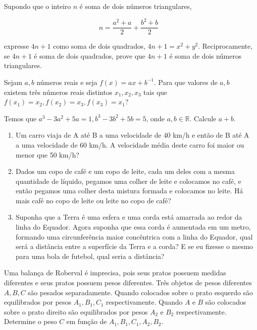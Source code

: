 \begin{questao}
  Supondo que o inteiro $n$ é soma de dois números triangulares,

  $$ n = \frac{a^2+a}{2} + \frac{b^2+b}{2} $$

  expresse $4n+1$ como soma de dois quadrados, $4n+1 = x^2+y^2$. Reciprocamente,
  se $4n+1$ é soma de dois quadrados, prove que $4n+1$ é soma de dois números
  triangulares.
\end{questao}

\begin{questao}
  Sejam $a,b$ números reais e seja $f(x) = {ax+b}^{-1}$. Para que valores de
  $a,b$ existem três números reais distintos $x_1,x_2,x_3$ tais que $f(x_1) =
  x_2, f(x_2) = x_3, f(x_3) = x_1$?
\end{questao}

\begin{questao}
  Temos que $a^3-3a^2+5a = 1, b^3-3b^2+5b=5$, onde $a,b \in \mathbb{R}$. Calcule
  $a+b$.
\end{questao}

\begin{questao}

  \begin{enumerate}

  \item Um carro viaja de A até B a uma velocidade de 40 km/h e então de B até A
    a uma velocidade de 60 km/h. A velocidade média deste carro foi maior ou
    menor que 50 km/h?

  \item Dados um copo de café e um copo de leite, cada um deles com a mesma
    quantidade de líquido, pegamos uma colher de leite e colocamos no café, e
    então pegamos uma colher desta mistura formada e colocamos no leite. Há mais
    café no copo de leite ou leite no copo de café?

  \item Suponha que a Terra é uma esfera e uma corda está amarrada ao redor da
    linha do Equador. Agora suponha que essa corda é aumentada em um metro,
    formando uma circunferência maior concêntrica com a linha do Equador, qual
    será a distância entre a superfície da Terra e a corda? E se eu fizesse o
    mesmo para uma bola de futebol, qual seria a distância?
  \end{enumerate}

\end{questao}

\begin{questao}
  Uma balança de Roberval é imprecisa, pois seus pratos possuem medidas
  diferentes e seus pratos possuem pesos diferentes. Três objetos de pesos
  diferentes $A,B,C$ são pesados separadamente. Quando colocados sobre o prato
  esquerdo são equilibrados por pesos $A_1,B_1,C_1$ respectivamente. Quando $A$
  e $B$ são colocados sobre o prato direito são equilibrados por pesos $A_2$ e
  $B_2$ respectivamente. Determine o peso $C$ em função de
  $A_1,B_1,C_1,A_2,B_2$.
\end{questao}

